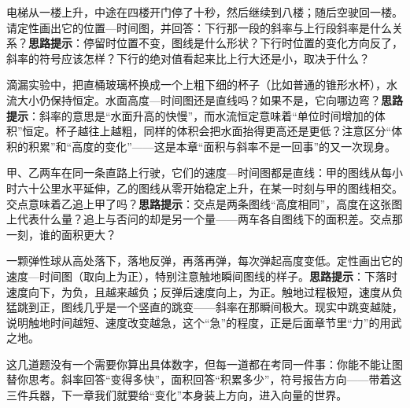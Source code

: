 \begin{puzzles}
\item 电梯从一楼上升，中途在四楼开门停了十秒，然后继续到八楼；随后空驶回一楼。请定性画出它的位置—时间图，并回答：下行那一段的斜率与上行段斜率是什么关系？\textbf{思路提示}：停留时位置不变，图线是什么形状？下行时位置的变化方向反了，斜率的符号应该怎样？下行的绝对值看起来比上行大还是小，取决于什么？

\item 滴漏实验中，把直桶玻璃杯换成一个上粗下细的杯子（比如普通的锥形水杯），水流大小仍保持恒定。水面高度—时间图还是直线吗？如果不是，它向哪边弯？\textbf{思路提示}：斜率的意思是“水面升高的快慢”，而水流恒定意味着“单位时间增加的体积”恒定。杯子越往上越粗，同样的体积会把水面抬得更高还是更低？注意区分“体积的积累”和“高度的变化”——这是本章“面积与斜率不是一回事”的又一次现身。

\item 甲、乙两车在同一条直路上行驶，它们的速度—时间图都是直线：甲的图线从每小时六十公里水平延伸，乙的图线从零开始稳定上升，在某一时刻与甲的图线相交。交点意味着乙追上甲了吗？\textbf{思路提示}：交点是两条图线“高度相同”，高度在这张图上代表什么量？追上与否问的却是另一个量——两车各自图线下的面积差。交点那一刻，谁的面积更大？

\item 一颗弹性球从高处落下，落地反弹，再落再弹，每次弹起高度变低。定性画出它的速度—时间图（取向上为正），特别注意触地瞬间图线的样子。\textbf{思路提示}：下落时速度向下，为负，且越来越负；反弹后速度向上，为正。触地过程极短，速度从负猛跳到正，图线几乎是一个竖直的跳变——斜率在那瞬间极大。现实中跳变越陡，说明触地时间越短、速度改变越急，这个“急”的程度，正是后面章节里“力”的用武之地。
\end{puzzles}

这几道题没有一个需要你算出具体数字，但每一道都在考同一件事：你能不能让图替你思考。斜率回答“变得多快”，面积回答“积累多少”，符号报告方向——带着这三件兵器，下一章我们就要给“变化”本身装上方向，进入向量的世界。
